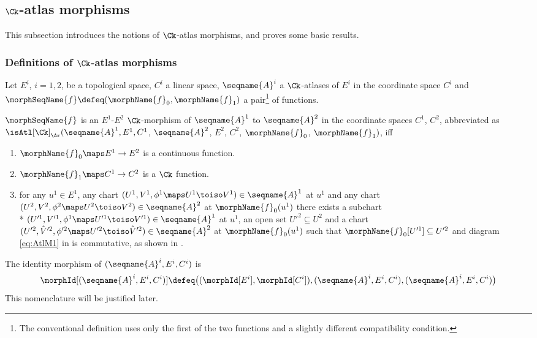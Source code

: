 \documentclass{article}
\begin{document}
\subsection{$\Ck$-atlas morphisms}
This subsection introduces the notions of $\Ck$-atlas morphisms, and
proves some basic results.

\subsubsection{Definitions of \ensuremath{\Ck}-atlas morphisms}
\begin{definition}
\label{def:Ck-ATLmorph}
Let $E^i$, $i=1,2$, be a topological space, $C^i$ a linear space,
$\seqname{A}^i$ a $\Ck$-atlases of $E^i$ in the coordinate space $C^i$ and
$\morphSeqName{f} \defeq (\morphName{f}_0, \morphName{f}_1)$ a
pair\footnote{
  The conventional definition uses only the first of the two
  functions and a slightly different compatibility condition.
}
of functions.

$\morphSeqName{f}$ is an $E^1$-$E^2$ $\Ck$-morphism of $\seqname{A}^1$ to
$\seqname{A}^2$ in the coordinate spaces $C^1$, $C^2$, abbreviated as
$\isAtl[\Ck]_\Ar(\seqname{A}^1, E^1, C^1$,
                  $\seqname{A}^2$, $E^2$, $C^2$,
                  $\morphName{f}_0$, $\morphName{f}_1)$,
iff
\begin{enumerate}
\item $\morphName{f}_0 \maps E^1 \to E^2$ is a continuous function.
\item $\morphName{f}_1 \maps C^1 \to C^2$ is a $\Ck$ function.
\item for any $u^1 \in E^1$, any chart
$(U^1, V^1, \phi^1 \maps U^1 \toiso V^1) \in \seqname{A}^1$ at $u^1$
and any chart
$(U^2, V^2, \phi^2 \maps U^2 \toiso V^2) \in \seqname{A}^2$ at
$\morphName{f}_0(u^1)$ there exists a subchart \\*
$
  (U'^1, V'^1, \phi^1 \maps U'^1 \toiso V'^1)
  \in \seqname{A}^1
$
at $u^1$, an open set $U'^2 \subseteq U^2$ and a chart
$
  (U'^2 ,\hat{V}'^2, \phi'^2 \maps U'^2 \toiso \hat{V}'^2)
  \in \seqname{A}^2
$
at $\morphName{f}_0(u^1)$ such that
$\morphName{f}_0[U'^1] \subseteq U'^2$ and diagram \eqref{eq:AtlM1} in
 is commutative, as shown in .
\end{enumerate}

The identity morphism of $(\seqname{A}^i, E^i, C^i)$ is
\begin{equation}
\morphId[{{(\seqname{A}^i, E^i, C^i)}}] \defeq
\bigl (
  (\morphId[E^i], \morphId[C^i]),
  (\seqname{A}^i, E^i, C^i),
  (\seqname{A}^i, E^i, C^i)
\bigr )
\end{equation}
This nomenclature will be justified later.


\end{definition}
\end{document}

